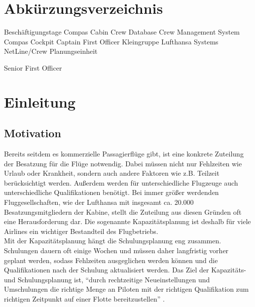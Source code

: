\documentclass [12pt, a4paper, oneside, titlepage, ngerman]{article}
\begin{document}
\tableofcontents
\newpage




\section*{Abkürzungsverzeichnis}

\begin{acronym}[NL/C]

 {Beschäftigungstage}
 {Compas Cabin}
 {Crew Database}
 {Crew Management System}
 {Compas Cockpit}
 {Captain}
 {First Officer}
 {Kleingruppe}
 {Lufthansa Systems}
 {NetLine/Crew}
 {Planungseinheit}

 {Senior First Officer}



\end{acronym}
\newpage


\listoffigures
\newpage


\setcounter{page}{1}
\section{Einleitung}
\subsection {Motivation}

Bereits seitdem es kommerzielle Passagierflüge gibt, ist eine konkrete Zuteilung der Besatzung für die Flüge notwendig. Dabei müssen nicht nur Fehlzeiten wie Urlaub oder Krankheit, sondern auch andere Faktoren wie z.B. Teilzeit berücksichtigt werden. Außerdem werden für unterschiedliche Flugzeuge auch unterschiedliche Qualifikationen benötigt. Bei immer größer werdenden Fluggesellschaften, wie der Lufthansa mit insgesamt ca. 20.000 Besatzungsmitgliedern der Kabine, stellt die Zuteilung aus diesen Gründen oft eine Herausforderung dar. Die sogenannte Kapazitätsplanung ist deshalb für viele Airlines ein wichtiger Bestandteil des Flugbetriebs. \\
Mit der Kapazitätsplanung hängt die Schulungsplanung eng zusammen. Schulungen dauern oft einige Wochen und müssen daher langfristig vorher geplant werden, sodass Fehlzeiten ausgeglichen werden können und die Qualifikationen nach der Schulung aktualisiert werden. Das Ziel der Kapazitäts- und Schulungsplanung ist, "`durch rechtzeitige Neueinstellungen und Umschulungen die richtige Menge an Piloten mit der richtigen Qualifikation zum richtigen Zeitpunkt auf einer Flotte bereitzustellen"' \cite[vgl.][S.19]{compasdoku}. \\
\end{document}
